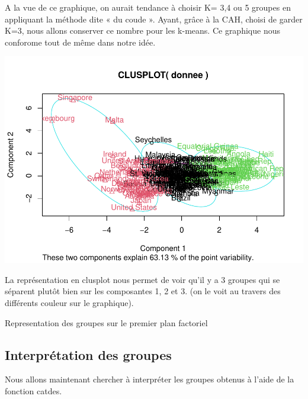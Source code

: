 \documentclass[
]{article}
\newenvironment{Shaded}{}{}
\newcommand{\AttributeTok}[1]{#1}
\newcommand{\DecValTok}[1]{#1}
\newcommand{\FunctionTok}[1]{#1}
\newcommand{\NormalTok}[1]{#1}
\newcommand{\OtherTok}[1]{\textcolor[rgb]{1.00,0.25,0.00}{#1}}
\newcommand{\SpecialCharTok}[1]{\textcolor[rgb]{0.00,0.50,0.50}{#1}}
\begin{document}
A la vue de ce graphique, on aurait tendance à choisir K= 3,4 ou 5
groupes en appliquant la méthode dite « du coude ». Ayant, grâce à la
CAH, choisi de garder K=3, nous allons conserver ce nombre pour les
k-means. Ce graphique nous conforome tout de même dans notre idée.

\begin{Shaded}
\end{Shaded}

\includegraphics{Projet_files/figure-latex/unnamed-chunk-24-1.pdf}

La représentation en clusplot nous permet de voir qu'il y a 3 groupes
qui se séparent plutôt bien sur les composantes 1, 2 et 3. (on le voit
au travers des différents couleur sur le graphique).

Representation des groupes sur le premier plan factoriel

\hypertarget{interpruxe9tation-des-groupes}{%
\subsection{Interprétation des
groupes}\label{interpruxe9tation-des-groupes}}

Nous allons maintenant chercher à interpréter les groupes obtenus à
l'aide de la fonction catdes.
\end{document}
